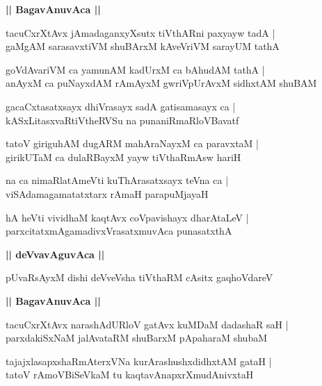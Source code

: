 \documentclass[twoside,12pt,openright]{book}
\newcounter{shloka}[chapter]
\def\uvaca#1{\centerline{{\large\textbf{#1}}}}
\begin{document}
\uvaca{|| BagavAnuvAca ||}

\begin{shloka}%
tacuCxrXtAvx jAmadaganxyXsutx tiVthARni paxyayw tadA |\\
gaMgAM sarasavxtiVM shuBArxM kAveVriVM sarayUM tathA 
\end{shloka}

\begin{shloka}%
goVdAvariVM ca yamunAM kadUrxM ca bAhudAM tathA |\\
anAyxM ca puNayxdAM rAmAyxM gwriVpUrAvxM sidhxtAM shuBAM 
\end{shloka}

\begin{shloka}%
gacaCxtasatxsayx dhiVrasayx sadA gatisamasayx ca |\\
kASxLitasxvaRtiVtheRVSu na punaniRmaRloVBavatf 
\end{shloka}

\begin{shloka}%
tatoV giriguhAM dugARM mahAraNayxM ca paravxtaM |\\
girikUTaM ca dulaRBayxM yayw tiVthaRmAsw hariH 
\end{shloka}

\begin{shloka}%
na ca nimaRlatAmeVti kuThArasatxsayx teVna ca |\\
viSAdamagamatatxtarx rAmaH parapuMjayaH 
\end{shloka}

\begin{shloka}%
hA heVti vividhaM kaqtAvx coVpavishayx dharAtaLeV |\\
parxcitatxmAgamadivxVrasatxmuvAca punasatxthA 
\end{shloka}

\uvaca{|| deVvavAguvAca ||}

\begin{shloka}%
pUvaRsAyxM dishi deVveVsha tiVthaRM cAsitx gaqhoVdareV 
\end{shloka}

\uvaca{|| BagavAnuvAca ||}

\begin{shloka}%
tacuCxrXtAvx narashAdURloV gatAvx kuMDaM dadashaR saH |\\
parxdakiSxNaM jalAvataRM shuBarxM pApaharaM shubaM 
\end{shloka}

\begin{shloka}%
tajajxlasapxshaRmAterxVNa kurArashushxdidhxtAM gataH |\\
tatoV rAmoVBiSeVkaM tu kaqtavAnapxrXmudAnivxtaH 
\end{shloka}
\end{document}
